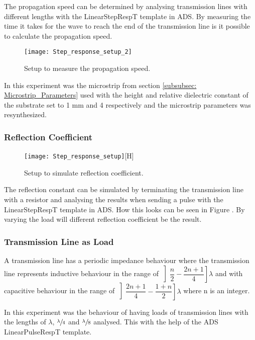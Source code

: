 \documentclass[report.tex]{subfiles}
\begin{document}
The propagation speed can be determined by analysing transmission lines with different lengths with the LinearStepRespT template in ADS. By measuring the time it takes for the wave to reach the end of the transmission line is it possible to calculate the propagation speed.
\begin{figure}[H]
	\texttt{[image: Step\_response\_setup\_2]}
	\caption{Setup to measure the propagation speed.}
\end{figure}
In this experiment was the microstrip from section \ref{subsubsec: Microstrip_Parameters} used with the height and relative dielectric constant of the substrate set to 1 mm and 4 respectively and the microstrip parameters was resynthesized.

\subsubsection{Reflection Coefficient}

\begin{figure}
	\texttt{[image: Step\_response\_setup]}[H]
	\caption{Setup to simulate reflection coefficient.}\label{fig:Lab1 reflection coefficient}
\end{figure}

The reflection constant can be simulated by terminating the transmission line with a resistor and analysing the results when sending a pulse with the LinearStepRespT template in ADS. How this looks can be seen in Figure \label{fig:Lab1 reflection coefficient}. By varying the load will different reflection coefficient be the result.

\subsubsection{Transmission Line as Load}
A transmission line has a periodic impedance behaviour where the transmission line represents inductive behaviour in the range of $\left] \dfrac{n}{2} - \dfrac{2n + 1}{4} \right]\lambda$ and with capacitive behaviour in the range of $\left]\dfrac{2n + 1}{4} - \dfrac{1 + n}{2} \right]\lambda$ where n is an integer.

In this experiment was the behaviour of having loads of transmission lines with the lengths of $\lambda$, $\sfrac{\lambda}{4}$ and $\sfrac{\lambda}{8}$ analysed. This with the help of the ADS LinearPulseRespT template.
\end{document}
